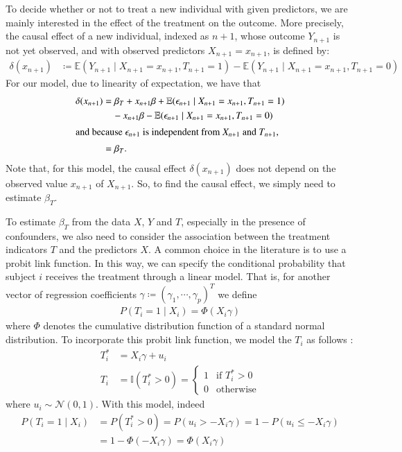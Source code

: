 \documentclass[preprint,12pt]{elsarticle}
\begin{document}
To decide whether or not to treat a new individual with given predictors,
we are mainly interested in the effect of the treatment on the outcome.
More precisely, the causal effect of a new individual, indexed as $n+1$,
whose outcome $Y_{n+1}$ is not yet observed, and with observed predictors $X_{n+1}=x_{n+1}$, is defined by:
\begin{align}
  \delta(x_{n+1})
  &\coloneqq\mathbb{E}(Y_{n+1}\mid X_{n+1}=x_{n+1},T_{n+1} =1) - \mathbb{E}(Y_{n+1}\mid X_{n+1}=x_{n+1},T_{n+1}=0)
\end{align}
For our model, due to linearity of expectation, we have that
\begin{align}
  \delta(x_{n+1})
  &=\beta_T+x_{n+1}\beta+\mathbb{E}(\epsilon_{n+1}\mid X_{n+1}=x_{n+1},T_{n+1} =1) \\
  &\quad - x_{n+1}\beta-\mathbb{E}(\epsilon_{n+1}\mid X_{n+1}=x_{n+1},T_{n+1} =0)\\
  \intertext{and because $\epsilon_{n+1}$ is independent from $X_{n+1}$ and $T_{n+1}$,}
  &=\beta_{T}.
\end{align}
Note that, for this model, the causal effect $\delta(x_{n+1})$
does not depend on the observed value $x_{n+1}$ of $X_{n+1}$.
So, to find the causal effect, we simply need to estimate $\beta_T$.

To estimate $\beta_T$ from the data $X$, $Y$ and $T$,
especially in the presence of confounders,
we also need to consider the
association between the treatment indicators $T$ and the predictors $X$.
A common choice in the literature is to use a probit link function.
In this way, we can
specify the conditional probability that subject $i$ receives the treatment through a linear model. 
That is, for another vector of regression coefficients 
$\gamma\coloneqq(\gamma_1, \cdots, \gamma_p)^T$ we define
\begin{align}
	P(T_i=1\mid X_i) = \Phi(X_i\gamma)
\end{align}
where $\Phi$ denotes the cumulative distribution function
of a standard normal distribution. To incorporate this probit
link function, we model the $T_i$ as follows \citep{albert93}:
\begin{align}
    T_i^* &= X_i\gamma +u_i \\
    T_i   &= \mathbb{I}(T_i^*>0)
    =
    \begin{cases}
    1 & \text{if }T_i^*>0 \\
    0 & \text{otherwise}
    \end{cases}
\end{align}
where $u_i\sim\mathcal{N}(0,1)$.
With this model, indeed
\begin{align}
  P(T_i=1\mid X_i)
  &=P(T_i^*>0)=P(u_i>-X_i\gamma)=1-P(u_i\le -X_i\gamma) \\
  &=1-\Phi(-X_i\gamma)=\Phi(X_i\gamma)
\end{align}
\end{document}
